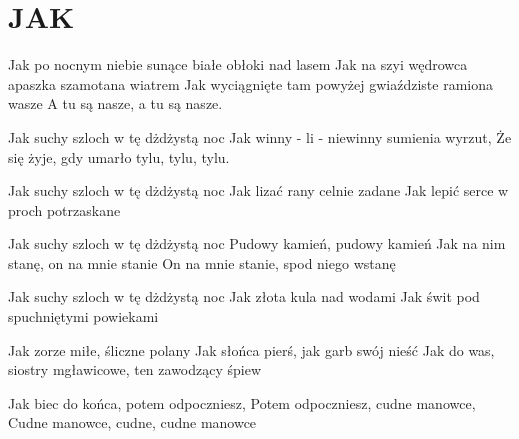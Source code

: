 \documentclass[../../../songbook.tex]{subfiles}
\begin{document}
\TabPositions{9cm} %
\section*{JAK}
{}
\vspace{0.5cm}
Jak po nocnym niebie sunące białe obłoki nad lasem		 \newline		
Jak na szyi wędrowca apaszka szamotana wiatrem			 \newline	
Jak wyciągnięte tam powyżej gwiaździste ramiona wasze	 \newline	
A tu są nasze, a tu są nasze.			 \newline	

\-\hspace{1cm} Jak suchy szloch w tę dżdżystą noc			 \newline
\-\hspace{1cm} Jak winny - li - niewinny sumienia wyrzut,			 \newline
\-\hspace{1cm} Że się żyje, gdy umarło tylu, tylu, tylu.			 \newline

Jak suchy szloch w tę dżdżystą noc			 \newline
Jak lizać rany celnie zadane			 \newline
Jak lepić serce w proch potrzaskane			 \newline

\-\hspace{1cm} Jak suchy szloch w tę dżdżystą noc			 \newline
\-\hspace{1cm} Pudowy kamień, pudowy kamień			 \newline
\-\hspace{1cm} Jak na nim stanę, on na mnie stanie			 \newline
\-\hspace{1cm} On na mnie stanie, spod niego wstanę			 \newline

Jak suchy szloch w tę dżdżystą noc			 \newline
Jak złota kula nad wodami			 \newline
Jak świt pod spuchniętymi powiekami			 \newline

\-\hspace{1cm} Jak zorze miłe, śliczne polany			 \newline
\-\hspace{1cm} Jak słońca pierś, jak garb swój nieść			 \newline
\-\hspace{1cm} Jak do was, siostry mgławicowe, ten zawodzący śpiew			 \newline

Jak biec do końca, potem odpoczniesz, 			 \newline
Potem odpoczniesz, cudne manowce, 			 \newline
Cudne manowce, cudne, cudne manowce			 \newline
\end{document}
